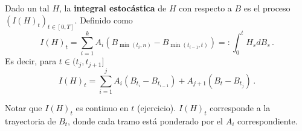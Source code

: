 \begin{definition}
Dado un tal $H$, la \textbf{integral estocástica} de $H$ con respecto a $B$ es el proceso $\left(I(H)_t \right)_{t \in [0,T]}$. Definido como 
\begin{equation*}
    I(H)_t = \sum_{i=1}^{k} A_i \left( B_{\min(t_i,n)} - B_{\min(t_{i-1},t)} \right) =: \int_{0}^{t} H_s dB_s\,.
\end{equation*}
Es decir, para $t \in (t_j, t_{j+1}]$ 
\begin{equation*}
    I(H)_t = \sum_{i=1}^{j} A_i\left( B_{t_i} - B_{t_{i-1}}  \right) + A_{j+1}(B_t - B_{t_{j}})\,.
\end{equation*}
\end{definition}
Notar que $I(H)_t$ es continuo en $t$ (ejercicio). $I(H)_{t}$ corresponde a la trayectoria de $B_t$, donde cada tramo está ponderado por el $A_i$ correspondiente. 

